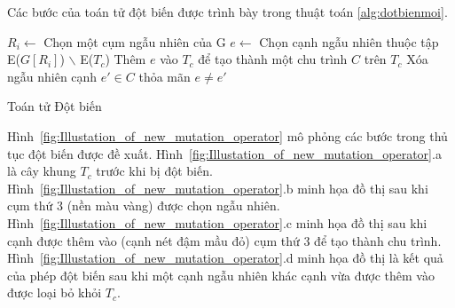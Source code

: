 Các bước của toán tử đột biến được trình bày trong thuật toán \ref{alg:dotbienmoi}.
\begin{algorithm}[htbp]
	\BlankLine
	\Begin
	{	
		$R_i \leftarrow$ Chọn một cụm ngẫu nhiên của G\;
		$e \leftarrow$ Chọn cạnh ngẫu nhiên thuộc tập E($G[R_i]$) $\backslash$ E($T_c$)\;
		Thêm $e$ vào $T_c$ để tạo thành một chu trình $C$ trên $T_c$\;
		Xóa ngẫu nhiên cạnh $e' \in C$ thỏa mãn $e \neq e'$ \;
	}
	\caption{Toán tử Đột biến}
	\label{alg:dotbienmoi}
\end{algorithm}

Hình~\ref{fig:Illustation_of_new_mutation_operator} mô phỏng các bước trong thủ tục đột biến được đề xuất. Hình~\ref{fig:Illustation_of_new_mutation_operator}.a là cây khung $T_c$ trước khi bị đột biến. Hình~\ref{fig:Illustation_of_new_mutation_operator}.b minh họa đồ thị sau khi cụm thứ 3 (nền màu vàng) được chọn ngẫu nhiên. Hình~\ref{fig:Illustation_of_new_mutation_operator}.c minh họa đồ thị sau khi cạnh được thêm vào (cạnh nét đậm mầu đỏ) cụm thứ 3 để tạo thành chu trình. Hình~\ref{fig:Illustation_of_new_mutation_operator}.d minh họa đồ thị là kết quả của phép đột biến  sau khi một cạnh ngẫu nhiên khác cạnh vừa được thêm vào được loại bỏ khỏi $T_c$.


